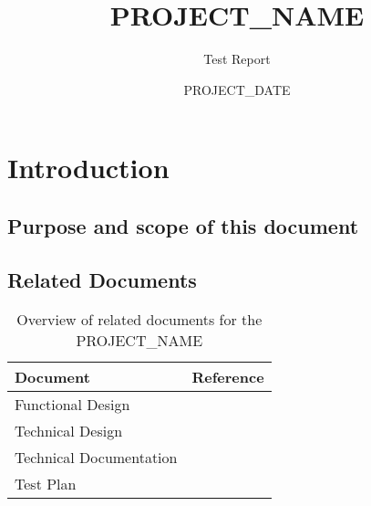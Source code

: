 \documentclass[signature]{deltares_report}
\begin{document}
\pagestyle{empty}
\cleardoublepage
%

\newcommand{\ProgramName}{PROJECT_NAME\xspace}

\title{\ProgramName}
\subtitle{Test Report}
\classification{-}

\date{PROJECT_DATE}



\summary{}

\revieweri{}
\approvali{}

\disclaimer{}

\deltarestitle


\chapter{Introduction} 
\label{chapterIntroduction}

\section{Purpose and scope of this document} \label{sec:PurposeAndScope}


\section{Related Documents}
\label{sec:RelatedDocuments}
\bigskip
\begin{longtable}{|p{}|p{}|}
\caption{Overview of related documents for the \ProgramName \label{tab:RelatedDocuments}}\\	\hline
		\hline 
		\textbf{Document} & \textbf{Reference} \\
		\hline 
		\hline 
		Functional Design & \citep{PROJECT_NAME_FunctionalDesignPROJECT_YEAR} \\
		Technical Design & \citep{PROJECT_NAME_TechnicalDesignPROJECT_YEAR} \\
		Technical Documentation & \citep{PROJECT_NAME_TechnicalDocumentationPROJECT_YEAR} \\
		Test Plan & \citep{PROJECT_NAME_TestPlanPROJECT_YEAR} \\
    \hline			
\end{longtable}
\end{document}
